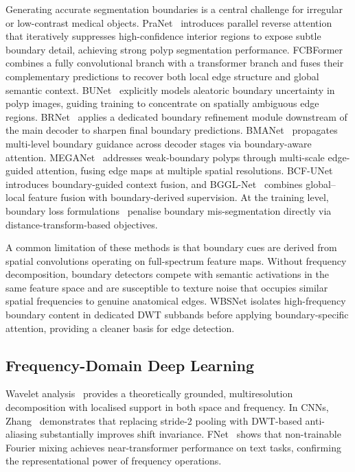 \documentclass[journal]{IEEEtran}
\begin{document}
Generating accurate segmentation boundaries is a central challenge for
irregular or low-contrast medical objects.
PraNet~\cite{fan2020pranet} introduces parallel reverse attention that
iteratively suppresses high-confidence interior regions to expose subtle
boundary detail, achieving strong polyp segmentation performance.
FCBFormer~\cite{fcbformer2022} combines a fully convolutional branch with a
transformer branch and fuses their complementary predictions to recover both
local edge structure and global semantic context.
BUNet~\cite{bunet2023} explicitly models aleatoric boundary uncertainty in
polyp images, guiding training to concentrate on spatially ambiguous edge
regions.
BRNet~\cite{brnet2024} applies a dedicated boundary refinement module
downstream of the main decoder to sharpen final boundary predictions.
BMANet~\cite{bmanet2025} propagates multi-level boundary guidance across
decoder stages via boundary-aware attention.
MEGANet~\cite{meganet2024} addresses weak-boundary polyps through multi-scale
edge-guided attention, fusing edge maps at multiple spatial resolutions.
BCF-UNet~\cite{bcfunet2024} introduces boundary-guided context fusion, and
BGGL-Net~\cite{bgglnet2025} combines global--local feature fusion with
boundary-derived supervision.
At the training level, boundary loss formulations~\cite{kervadec2019boundaryloss}
penalise boundary mis-segmentation directly via distance-transform-based objectives.

A common limitation of these methods is that boundary cues are derived from
spatial convolutions operating on full-spectrum feature maps.
Without frequency decomposition, boundary detectors compete with semantic
activations in the same feature space and are susceptible to texture noise that
occupies similar spatial frequencies to genuine anatomical edges.
WBSNet isolates high-frequency boundary content in dedicated DWT subbands
before applying boundary-specific attention, providing a cleaner basis for
edge detection.

\subsection{Frequency-Domain Deep Learning}

Wavelet analysis~\cite{mallat1989wavelet} provides a theoretically grounded,
multiresolution decomposition with localised support in both space and
frequency.
In CNNs, Zhang~\cite{zhang2019makingshiftinvariant} demonstrates that
replacing stride-2 pooling with DWT-based anti-aliasing substantially
improves shift invariance.
FNet~\cite{rao2022fnet} shows that non-trainable Fourier mixing achieves
near-transformer performance on text tasks, confirming the representational
power of frequency operations.
\end{document}
